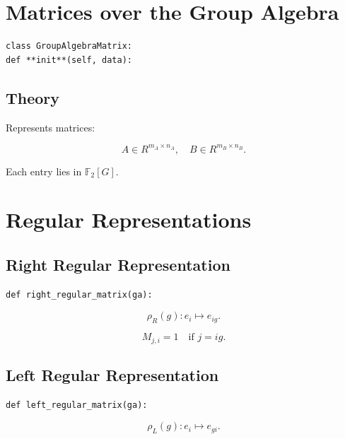\documentclass[11pt]{article}
\begin{document}
\section{Matrices over the Group Algebra}

\begin{verbatim}
class GroupAlgebraMatrix:
def **init**(self, data):
\end{verbatim}

\subsection{Theory}

Represents matrices:

\begin{equation}
A \in R^{m_A \times n_A}, \quad B \in R^{m_B \times n_B}.
\end{equation}

Each entry lies in $\mathbb{F}_2[G]$.

\section{Regular Representations}

\subsection{Right Regular Representation}

\begin{verbatim}
def right_regular_matrix(ga):
\end{verbatim}

\begin{equation}
\rho_R(g): e_i \mapsto e_{i g}.
\end{equation}

\begin{equation}
M_{j,i} = 1 \quad \text{if } j = i g.
\end{equation}

\subsection{Left Regular Representation}

\begin{verbatim}
def left_regular_matrix(ga):
\end{verbatim}

\begin{equation}
\rho_L(g): e_i \mapsto e_{g i}.
\end{equation}
\end{document}
